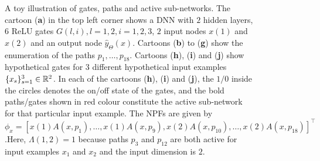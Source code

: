 \begin{figure}[h]

\caption{A toy illustration of gates, paths and active sub-networks. The cartoon (\textbf{a}) in the top left corner shows a DNN with $2$ hidden layers, $6$ ReLU gates $G(l,i),l=1,2,i=1,2,3$, $2$ input nodes $x(1)$ and $x(2)$ and an output node $\hat{y}_{\Theta}(x)$. Cartoons (\textbf{b}) to (\textbf{g}) show the enumeration of the paths $p_1,\ldots, p_{18}$. Cartoons (\textbf{h}), (\textbf{i}) and (\textbf{j}) show hypothetical gates for $3$ different hypothetical input examples $\{x_s\}_{s=1}^3 \in\mathbb{R}^2$. In each of the cartoons (\textbf{h}), (\textbf{i}) and (\textbf{j}), the $1/0$ inside the circles denotes the on/off state of the gates, and the bold paths/gates shown in red colour constitute the active sub-network for that particular input example. The NPFs are given by $\phi_{x}=[x(1)A(x,p_1),\ldots,x(1)A(x,p_{9}),x(2)A(x,p_{10}),\ldots,x(2)A(x,p_{18})]^\top$.Here, $\Lambda(1,2)=1$ because paths $p_3$ and $p_{12}$ are both active for input examples $x_1$ and $x_2$ and the input dimension is $2$.}%
\label{fig:npkexample}
\end{figure}

